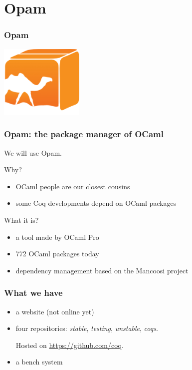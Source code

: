 \documentclass{beamer}
\begin{document}
  \section{Opam}
  \begin{frame}
    \frametitle{Opam}
    \begin{center}
      \includegraphics[width=4cm]{images/opam}
    \end{center}
  \end{frame}
  \begin{frame}
    \frametitle{Opam: the package manager of OCaml}
    We will use Opam.

    Why?
    \begin{itemize}
      \item OCaml people are our closest cousins
      \item some Coq developments depend on OCaml packages
    \end{itemize}
    What it is?
    \begin{itemize}
      \item a tool made by OCaml Pro
      \item 772 OCaml packages today
      \item dependency management based on the Mancoosi project
    \end{itemize}
  \end{frame}
  \begin{frame}
    \frametitle{What we have}
    \begin{itemize}
      \item a website (not online yet)
      \item four repositories: \emph{stable}, \emph{testing}, \emph{unstable}, \emph{coqs}.

        Hosted on \url{https://github.com/coq}.
      \item a bench system
    \end{itemize}
  \end{frame}
\end{document}
